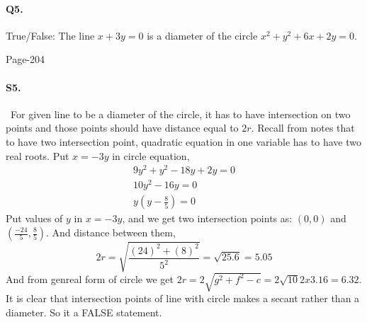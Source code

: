 \documentclass{article}
\begin{document}
\paragraph{Q5.}True/False: The line $x + 3y = 0$ is a diameter of the circle $x^2 + y^2 + 6x + 2y = 0$.
\begin{flushright}
    Page-204
\end{flushright}

\paragraph{S5.}\
For given line to be a diameter of the circle, it has to have intersection on two points and those points should have distance equal to $2r$. Recall from notes that to have two intersection point, quadratic equation in one variable has to have two real roots. Put $x=-3y$ in circle equation,
\begin{align*}
    9y^2+y^2-18y+2y=0\\
    10y^2-16y=0\\
    y(y-\frac{8}{5})=0
\end{align*}
Put values of $y$ in $x=-3y$, and we get two intersection points as: $(0,0)$ and $(\frac{-24}{5},\frac{8}{5})$. And distance between them,
\begin{equation*}
    2r=\sqrt{\frac{(24)^2+(8)^2}{5^2}}=\sqrt{25.6}=5.05
\end{equation*}
And from genreal form of circle we get $2r=2\sqrt{g^2+f^2-c}=2\sqrt{10}2x3.16=6.32$. It is clear that intersection points of line with circle makes a secant rather than a diameter. So it a FALSE statement.
\end{document}
